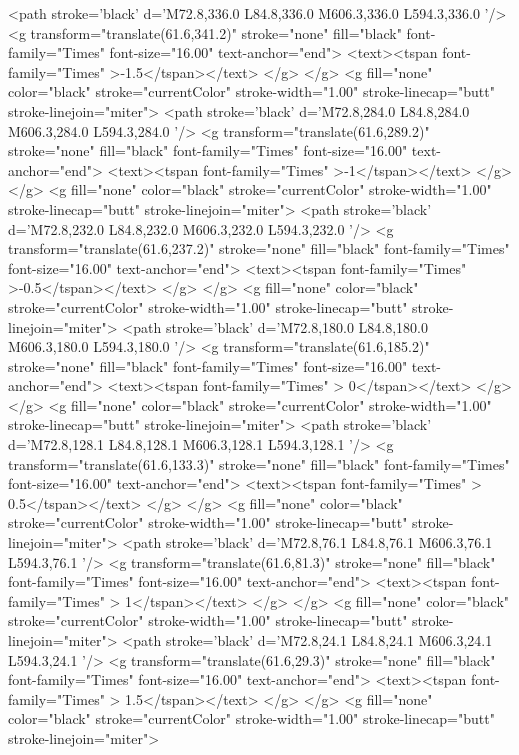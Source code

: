 	<path stroke='black'  d='M72.8,336.0 L84.8,336.0 M606.3,336.0 L594.3,336.0  '/>	<g transform="translate(61.6,341.2)" stroke="none" fill="black" font-family="Times" font-size="16.00"  text-anchor="end">
		<text><tspan font-family="Times" >-1.5</tspan></text>
	</g>
</g>
<g fill="none" color="black" stroke="currentColor" stroke-width="1.00" stroke-linecap="butt" stroke-linejoin="miter">
	<path stroke='black'  d='M72.8,284.0 L84.8,284.0 M606.3,284.0 L594.3,284.0  '/>	<g transform="translate(61.6,289.2)" stroke="none" fill="black" font-family="Times" font-size="16.00"  text-anchor="end">
		<text><tspan font-family="Times" >-1</tspan></text>
	</g>
</g>
<g fill="none" color="black" stroke="currentColor" stroke-width="1.00" stroke-linecap="butt" stroke-linejoin="miter">
	<path stroke='black'  d='M72.8,232.0 L84.8,232.0 M606.3,232.0 L594.3,232.0  '/>	<g transform="translate(61.6,237.2)" stroke="none" fill="black" font-family="Times" font-size="16.00"  text-anchor="end">
		<text><tspan font-family="Times" >-0.5</tspan></text>
	</g>
</g>
<g fill="none" color="black" stroke="currentColor" stroke-width="1.00" stroke-linecap="butt" stroke-linejoin="miter">
	<path stroke='black'  d='M72.8,180.0 L84.8,180.0 M606.3,180.0 L594.3,180.0  '/>	<g transform="translate(61.6,185.2)" stroke="none" fill="black" font-family="Times" font-size="16.00"  text-anchor="end">
		<text><tspan font-family="Times" > 0</tspan></text>
	</g>
</g>
<g fill="none" color="black" stroke="currentColor" stroke-width="1.00" stroke-linecap="butt" stroke-linejoin="miter">
	<path stroke='black'  d='M72.8,128.1 L84.8,128.1 M606.3,128.1 L594.3,128.1  '/>	<g transform="translate(61.6,133.3)" stroke="none" fill="black" font-family="Times" font-size="16.00"  text-anchor="end">
		<text><tspan font-family="Times" > 0.5</tspan></text>
	</g>
</g>
<g fill="none" color="black" stroke="currentColor" stroke-width="1.00" stroke-linecap="butt" stroke-linejoin="miter">
	<path stroke='black'  d='M72.8,76.1 L84.8,76.1 M606.3,76.1 L594.3,76.1  '/>	<g transform="translate(61.6,81.3)" stroke="none" fill="black" font-family="Times" font-size="16.00"  text-anchor="end">
		<text><tspan font-family="Times" > 1</tspan></text>
	</g>
</g>
<g fill="none" color="black" stroke="currentColor" stroke-width="1.00" stroke-linecap="butt" stroke-linejoin="miter">
	<path stroke='black'  d='M72.8,24.1 L84.8,24.1 M606.3,24.1 L594.3,24.1  '/>	<g transform="translate(61.6,29.3)" stroke="none" fill="black" font-family="Times" font-size="16.00"  text-anchor="end">
		<text><tspan font-family="Times" > 1.5</tspan></text>
	</g>
</g>
<g fill="none" color="black" stroke="currentColor" stroke-width="1.00" stroke-linecap="butt" stroke-linejoin="miter">
